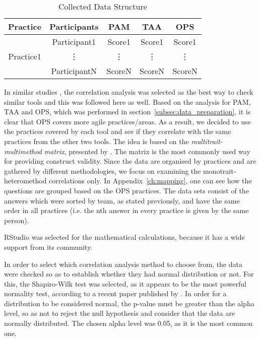 \begin{table} [H]
	\caption{Collected Data Structure}
	\label{table:data_structure}
	\begin{tabular}{| c | c | c | c | c |} \hline
	\textbf{Practice} & \textbf{Participants} & \textbf{\ac{PAM}} & \textbf{\ac{TAA}} & \textbf{\ac{OPS}} \\ \hline
	\multirow{3}{*}{Practice1} & Participant1 & Score1 & Score1 & Score1 \\ \hhline{~----}
	& \vdots & \vdots & \vdots  & \vdots \\ \hhline{~----}
	& ParticipantN & ScoreN & ScoreN & ScoreN \\ \hline
	\end{tabular}
\end{table}

In similar studies \cite{jalali_angelis,  Delestras2013}, the correlation analysis was selected as the best way to check similar tools and this was followed here as well. Based on the analysis for \ac{PAM}, \ac{TAA} and \ac{OPS}, which was  performed in section~\ref{subsec:data_preparation}, it is clear that \ac{OPS} covers more agile practices/areas. As a result, we decided to use the practices covered by each tool and see if they correlate with the same practices from the other two tools. The idea is based on the \textit{multitrait-multimethod matrix}, presented by \citet{campbell1959}. The matrix is the most commonly used way for providing construct validity. Since the data are organised by practices and are gathered by different methodologies, we focus on examining the monotrait-heteromethod correlations only. In Appendix~\ref{ch:mapping}, one can see how the questions are grouped based on the \ac{OPS} practices. The data sets consist of the answers which were sorted by team, as stated previously, and have the same order in all practices (i.e. the nth answer in every practice is given by the same person).

RStudio\texttrademark \cite{rstudio} was selected for the mathematical calculations, because it has a wide support from its community. 

In order to select which correlation analysis method to choose from, the data were checked so as to establish whether they had normal distribution or not. For this, the Shapiro-Wilk test was selected, as it appears to be the most powerful normality test, according to a recent paper published by \citet{Razali}. In order for a distribution to be considered normal, the p-value must be greater than the alpha level, so as not to reject the null hypothesis and consider that the data are normally distributed. The chosen alpha level was 0.05, as it is the most common one.

